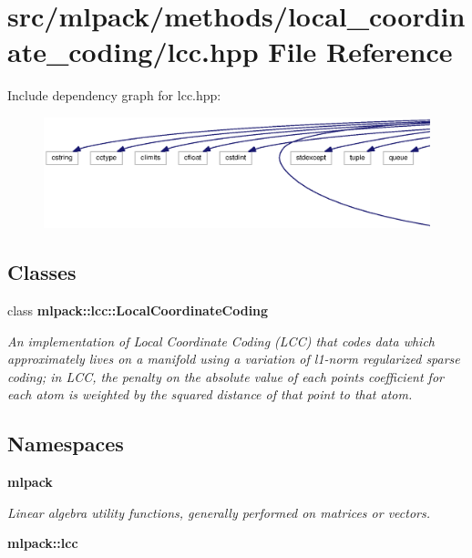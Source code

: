 \section{src/mlpack/methods/local\+\_\+coordinate\+\_\+coding/lcc.hpp File Reference}
\label{lcc_8hpp}
Include dependency graph for lcc.\+hpp\+:
\nopagebreak
\begin{figure}[H]
\begin{center}
\leavevmode
\includegraphics[width=350pt]{lcc_8hpp__incl}
\end{center}
\end{figure}
\subsection*{Classes}
\begin{DoxyCompactItemize}
\item 
class {\bf mlpack\+::lcc\+::\+Local\+Coordinate\+Coding}
\begin{DoxyCompactList}\small\item\em An implementation of Local Coordinate Coding (L\+CC) that codes data which approximately lives on a manifold using a variation of l1-\/norm regularized sparse coding; in L\+CC, the penalty on the absolute value of each point\textquotesingle{}s coefficient for each atom is weighted by the squared distance of that point to that atom. \end{DoxyCompactList}\end{DoxyCompactItemize}
\subsection*{Namespaces}
\begin{DoxyCompactItemize}
\item 
 {\bf mlpack}
\begin{DoxyCompactList}\small\item\em Linear algebra utility functions, generally performed on matrices or vectors. \end{DoxyCompactList}\item 
 {\bf mlpack\+::lcc}
\end{DoxyCompactItemize}


